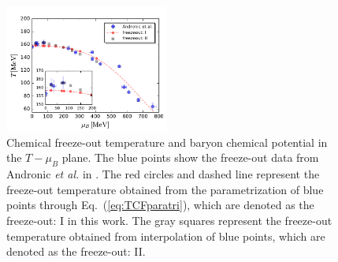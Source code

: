 \documentclass[%
reprint,
superscriptaddress,
showpacs,preprintnumbers,
 amsmath,amssymb,
 aps,
prd,
]{revtex4-1}
\def\Eq#1{Eq.~(\ref{#1})}
\begin{document}
%
\begin{figure}[t]
\includegraphics[width=0.48\textwidth]{phasediagram}
\caption{Chemical freeze-out temperature and baryon chemical potential in the $T-\mu_B$ plane. The blue points show the freeze-out data from Andronic {\it et al.} in \cite{Andronic:2017pug}. The red circles and dashed line represent the freeze-out temperature obtained from the parametrization of blue points through \Eq{eq:TCFparatri}, which are denoted as the freeze-out: I in this work. The gray squares represent the freeze-out temperature obtained from interpolation of blue points,  which are denoted as the freeze-out: II.}\label{fig:phasediagram}
\end{figure}
%
\end{document}
